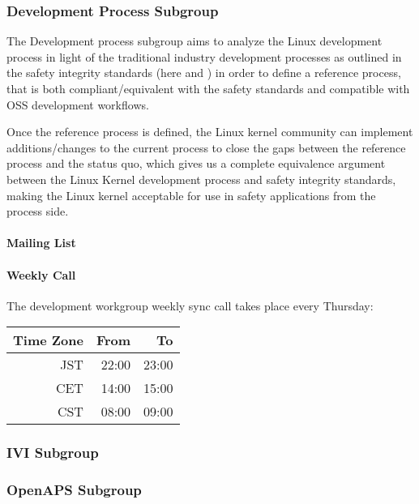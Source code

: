 \documentclass[12pt]{ElisaPaper}
\begin{document}
\subsubsection{Development Process Subgroup}
\label{sssec:Development Process Subgroup}
The Development process subgroup aims to analyze the Linux development process in light of the traditional industry development processes as outlined in the safety integrity standards (here \cite{IEC61508:2010} and \cite{ISO26262:2018}) in order to define a reference process, that is both compliant/equivalent with the safety standards and compatible with OSS development workflows.

Once the reference process is defined, the Linux kernel community can implement additions/changes to the current process to close the gaps between the reference process and the status quo, which gives us a complete equivalence argument between the Linux Kernel development process and safety integrity standards, making the Linux kernel acceptable for use in safety applications from the process side.

\paragraph{Mailing List}

\paragraph{Weekly Call}
The development workgroup weekly sync call takes place every Thursday:

\begin{center}
\begin{tabular}{rrr}
		\toprule
		Time Zone & From & To\\
		\midrule
		JST & 22:00 & 23:00 \\
		CET	& 14:00 & 15:00 \\
		CST & 08:00 & 09:00 \\
	\bottomrule
\end{tabular} 
\end{center}
\subsubsection{IVI Subgroup}
\label{sssec:IVI Subgroup}
\subsubsection{OpenAPS Subgroup}
\label{sssec:OpenAPS subgroup}
\end{document}
